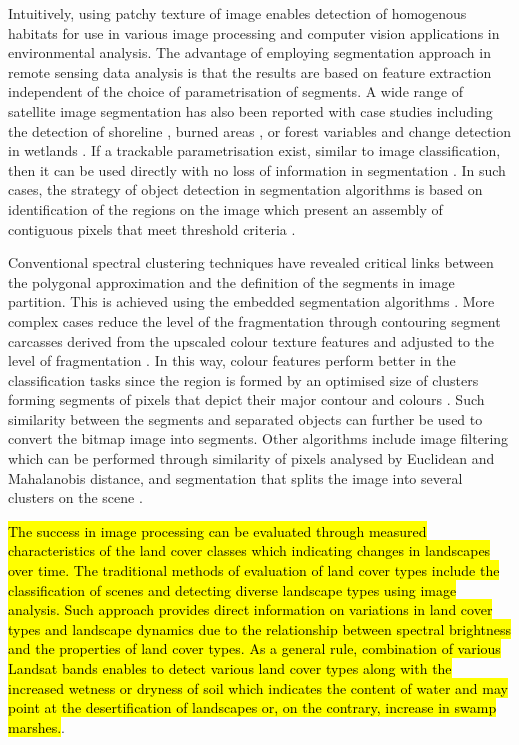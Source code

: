 \documentclass[analytics,article,submit,pdftex,moreauthors]{Definitions/mdpi}
\begin{document}
Intuitively, using patchy texture of image enables detection of homogenous habitats for use in various image processing and computer vision applications in environmental analysis. The advantage of employing segmentation approach in remote sensing data analysis is that the results are based on feature extraction independent of the choice of parametrisation of segments. A wide range of satellite image segmentation has also been reported with case studies including the detection of shoreline \cite{ERDEM2021964}, burned areas \cite{KOTARIDIS2023100944,Toulouse}, or forest variables \cite{MAKELA200166} and change detection in wetlands \cite{ZHANG2023129590}. If a trackable parametrisation exist, similar to image classification, then it can be used directly with no loss of information in segmentation \cite{Kharma}. In such cases, the strategy of object detection in segmentation algorithms is based on identification of the regions on the image which present an assembly of contiguous pixels that meet threshold criteria \cite{Aalan,Awad}. 

Conventional spectral clustering techniques have revealed critical links between the polygonal approximation and the definition of the segments in image partition. This is achieved using the embedded segmentation algorithms \cite{Saha,Pugazhenthi,Congetal2018}. More complex cases reduce the level of the fragmentation through contouring segment carcasses derived from the upscaled colour texture features and adjusted to the level of fragmentation \cite{1370344}. In this way, colour features perform better in the classification tasks since the region is formed by an optimised size of clusters forming segments of pixels that depict their major contour and colours \cite{1421832}. Such similarity between the segments and separated objects can further be used to convert the bitmap image into segments. Other algorithms include image filtering which can be performed through similarity of pixels analysed by Euclidean and Mahalanobis distance, and segmentation that splits the image into several clusters on the scene \cite{8302195,9302320,5432655}. 

\hl{The success in image processing can be evaluated through measured characteristics of the land cover classes which indicating changes in landscapes over time. The traditional methods of evaluation of land cover types include the classification of scenes and detecting diverse landscape types using image analysis. Such approach provides direct information on variations in land cover types and landscape dynamics due to the relationship between spectral brightness and the properties of land cover types. As a general rule, combination of various Landsat bands enables to detect various land cover types along with the increased wetness or dryness of soil  which indicates the content of water and may point at the desertification of landscapes or, on the contrary, increase in swamp marshes.}. 
\end{document}
